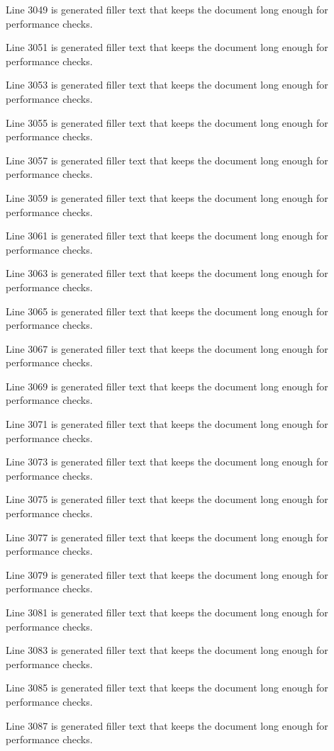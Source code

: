 Line 3049 is generated filler text that keeps the document long enough for performance checks.

Line 3051 is generated filler text that keeps the document long enough for performance checks.

Line 3053 is generated filler text that keeps the document long enough for performance checks.

Line 3055 is generated filler text that keeps the document long enough for performance checks.

Line 3057 is generated filler text that keeps the document long enough for performance checks.

Line 3059 is generated filler text that keeps the document long enough for performance checks.

Line 3061 is generated filler text that keeps the document long enough for performance checks.

Line 3063 is generated filler text that keeps the document long enough for performance checks.

Line 3065 is generated filler text that keeps the document long enough for performance checks.

Line 3067 is generated filler text that keeps the document long enough for performance checks.

Line 3069 is generated filler text that keeps the document long enough for performance checks.

Line 3071 is generated filler text that keeps the document long enough for performance checks.

Line 3073 is generated filler text that keeps the document long enough for performance checks.

Line 3075 is generated filler text that keeps the document long enough for performance checks.

Line 3077 is generated filler text that keeps the document long enough for performance checks.

Line 3079 is generated filler text that keeps the document long enough for performance checks.

Line 3081 is generated filler text that keeps the document long enough for performance checks.

Line 3083 is generated filler text that keeps the document long enough for performance checks.

Line 3085 is generated filler text that keeps the document long enough for performance checks.

Line 3087 is generated filler text that keeps the document long enough for performance checks.

